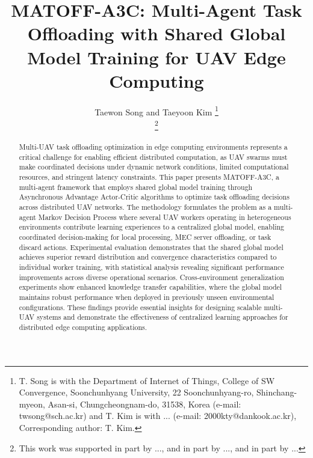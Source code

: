 \documentclass[journal]{IEEEtran}
\begin{document}
\title{MATOFF-A3C: Multi-Agent Task Offloading with Shared Global Model Training for UAV Edge Computing}

\author{Taewon Song and Taeyoon Kim
\thanks{T. Song is with the Department of Internet of Things, College of SW Convergence, Soonchunhyang University, 22 Soonchunhyang-ro, Shinchang-myeon, Asan-si, Chungcheongnam-do, 31538, Korea (e-mail: twsong@sch.ac.kr) and T. Kim is with ... (e-mail: 2000kty@dankook.ac.kr), Corresponding author: T. Kim.}%

\thanks{This work was supported in part by ..., and in part by ..., and in part by ...}
}

{}

\maketitle

\begin{abstract}
Multi-UAV task offloading optimization in edge computing environments represents a critical challenge for enabling efficient distributed computation, as UAV swarms must make coordinated decisions under dynamic network conditions, limited computational resources, and stringent latency constraints. This paper presents MATOFF-A3C, a multi-agent framework that employs shared global model training through Asynchronous Advantage Actor-Critic algorithms to optimize task offloading decisions across distributed UAV networks. The methodology formulates the problem as a multi-agent Markov Decision Process where several UAV workers operating in heterogeneous environments contribute learning experiences to a centralized global model, enabling coordinated decision-making for local processing, MEC server offloading, or task discard actions. Experimental evaluation demonstrates that the shared global model achieves superior reward distribution and convergence characteristics compared to individual worker training, with statistical analysis revealing significant performance improvements across diverse operational scenarios. Cross-environment generalization experiments show enhanced knowledge transfer capabilities, where the global model maintains robust performance when deployed in previously unseen environmental configurations. These findings provide essential insights for designing scalable multi-UAV systems and demonstrate the effectiveness of centralized learning approaches for distributed edge computing applications.
\end{abstract}
\end{document}
